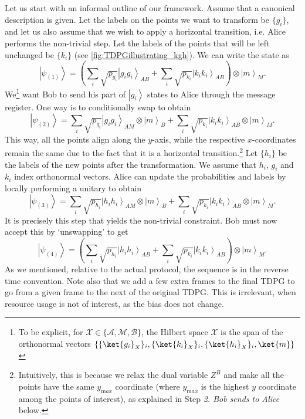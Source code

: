 \documentclass{article}
\newcommand{\atul}[1]{#1} %
\begin{document}
Let us start with an informal outline of our framework.
Assume that a canonical description is given. Let the
labels on the points we want to transform be $\{g_{i}\}$,
and let us also assume that we wish to apply a horizontal transition, i.e. Alice performs the non-trivial step. Let the labels of the
points that will be left unchanged be $\{k_{i}\}$
(see  \cref{fig:TDPGillustrating_kgh}). We can write the state as
\begin{displaymath}
  \left|\psi_{(1)}\right\rangle =\left(\sum_{i}\sqrt{p_{g_{i}}}\left|g_{i}g_{i}\right\rangle _{AB}+\sum_{i}\sqrt{p_{k_{i}}}\left|k_{i}k_{i}\right\rangle _{AB}\right)\otimes\left|m\right\rangle _{M}.
\end{displaymath}
We\footnote{To be explicit, for $\mathcal{X} \in \{\mathcal{A},\mathcal{M},\mathcal{B}\}$, the Hilbert space $\mathcal{X}$ is the span of the orthonormal vectors $\{\{\ket{g_i}_X\}_i,\{\ket{k_i}_X\}_i,\{\ket{h_i}_X\}_i,\ket{m}\}$} want Bob to send his part of $\left|g_{i}\right\rangle $ states
to Alice through the message register. One way is to conditionally
swap to obtain
\begin{displaymath}
  \left|\psi_{(2)}\right\rangle =\sum_{i}\sqrt{p_{g_{i}}}\left|g_{i}g_{i}\right\rangle _{AM}\otimes\left|m\right\rangle _{B}+\sum_{i}\sqrt{p_{k_{i}}}\left|k_{i}k_{i}\right\rangle _{AB}\otimes\left|m\right\rangle _{M}.
\end{displaymath}
This way, all the points align along the $y$-axis, while the respective $x$-coordinates remain the same due to the fact that it is a horizontal transition.\footnote{\atul{Intuitively, this is because we relax the dual variable $Z^B$ and make all the points have the same $y_{\mathrm max}$ coordinate (where $y_{\mathrm max}$ is the highest $y$ coordinate among the points of interest), as explained in Step \emph{2. Bob sends to Alice} below.}}
Let $\{h_{i}\}$ be the labels of the new points after the transformation.
We assume that $h_{i}$, $g_{i}$ and $k_{i}$ index orthonormal vectors.
Alice can update the probabilities and labels by locally performing
a unitary to obtain
\begin{displaymath}
  \left|\psi_{(3)}\right\rangle =\sum_{i}\sqrt{p_{h_{i}}}\left|h_{i}h_{i}\right\rangle _{AM}\otimes\left|m\right\rangle _{B}+\sum_{i}\sqrt{p_{k_{i}}}\left|k_{i}k_{i}\right\rangle _{AB}\otimes\left|m\right\rangle _{M}.
\end{displaymath}
It is precisely this step that yields the non-trivial constraint.
Bob must now accept this by `unswapping' to get
\begin{displaymath}
  \left|\psi_{(4)}\right\rangle =\left(\sum_{i}\sqrt{p_{h_{i}}}\left|h_{i}h_{i}\right\rangle _{AB}+\sum_{i}\sqrt{p_{k_{i}}}\left|k_{i}k_{i}\right\rangle _{AB}\right)\otimes\left|m\right\rangle _{M}.
\end{displaymath}
As we mentioned, relative to the actual protocol, the sequence is in the reverse time convention. Note also that we add a few extra frames to the final
TDPG to go from a given frame to the next of the original TDPG. This
is irrelevant, when resource usage is not of interest, as the bias
does not change.
\end{document}
